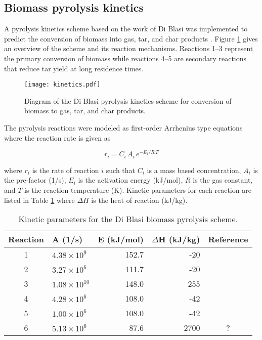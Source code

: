 
\subsection{Biomass pyrolysis kinetics}

A pyrolysis kinetics scheme based on the work of Di Blasi was implemented to predict the conversion of biomass into gas, tar, and char products \cite{Blasi-1993,Blasi-2001}. Figure \ref{fig:blasi} gives an overview of the scheme and its reaction mechanisms. Reactions 1--3 represent the primary conversion of biomass while reactions 4--5 are secondary reactions that reduce tar yield at long residence times.

\begin{figure}[H]
    \centering
    \texttt{[image: kinetics.pdf]}
    \caption{Diagram of the Di Blasi pyrolysis kinetics scheme for conversion of biomass to gas, tar, and char products.}
    \label{fig:blasi}
\end{figure}

The pyrolysis reactions were modeled as first-order Arrhenius type equations where the reaction rate is given as

\begin{equation}
    r_i = C_i\,A_i\,e^{-E_i / R\,T}
\end{equation}

\noindent where $r_i$ is the rate of reaction $i$ such that $C_i$ is a mass based concentration, $A_i$ is the pre-factor (1/s), $E_i$ is the activation energy (kJ/mol), $R$ is the gas constant, and $T$ is the reaction temperature (K). Kinetic parameters for each reaction are listed in Table \ref{tab:kinetic-params} where $\Delta H$ is the heat of reaction (kJ/kg).

\begin{table}[H]
    \centering
    \caption{Kinetic parameters for the Di Blasi biomass pyrolysis scheme.}
    \begin{tabular}{clrrc}
        \toprule
        Reaction    & A (1/s)               & E (kJ/mol) & $\Delta$H (kJ/kg) & Reference \\
        \midrule
        1           & $4.38 \times 10^9$    & 152.7      & -20               & \cite{Blasi-2001} \\
        2           & $3.27 \times 10^6$    & 111.7      & -20               & \cite{Blasi-2001} \\
        3           & $1.08 \times 10^{10}$ & 148.0      & 255               & \cite{Blasi-2001} \\
        4           & $4.28 \times 10^6$    & 108.0      & -42               & \cite{Blasi-1993} \\
        5           & $1.00 \times 10^6$    & 108.0      & -42               & \cite{Blasi-1993} \\
        6           & $5.13 \times 10^6$    & 87.6       & 2700              & ? \\
        \bottomrule
    \end{tabular}
    \label{tab:kinetic-params}
\end{table}

